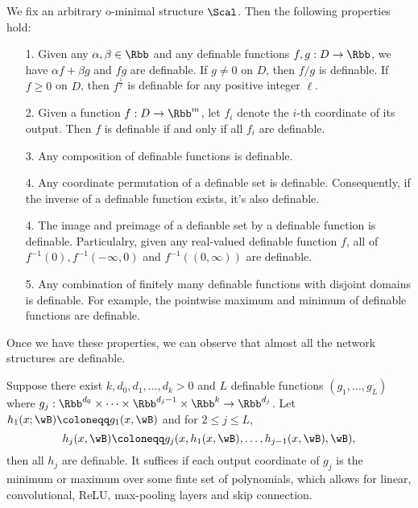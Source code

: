 \begin{proposition}
\label{prop:Property of definable functions} We fix an arbitrary o-minimal structure $\Scal$. Then the following properties hold:
\begin{itemize}
    \item [1.] Given any $\alpha , \beta \in \Rbb$ and any definable functions $f,g : D \to \Rbb$, we have $\alpha f + \beta g $ and $fg$ are definable. If $g \neq 0$ on $D$, then $f/g$ is definable. If $f \ge 0$ on $D$, then $f^{\frac{1}{\ell}}$ is definable for any positive integer $\ell$. 
    \item [2.] Given a function $f:D \to \Rbb^m$, let $f_i$ denote the $i$-th coordinate of its output. Then $f$ is definable if and only if all $f_i$ are definable. 
    \item [3.] Any composition of definable functions is definable. 
    \item [4.] Any coordinate permutation of a definable set is definable. Consequently, if the  inverse of a definable function exists, it's also definable. 
    \item [4.] The image and preimage of a defianble set by a definable function is definable. Particulalry, given any real-valued definable function $f$, all of $f^{-1}(0), f^{-1} ( -\infty, 0 )$ and $ f^{-1} ( (0,\infty) )  $ are definable. 
    \item [5.] Any combination of finitely many definable functions with disjoint domains is definable. For example, the pointwise maximum and minimum of definable functions are definable. 
\end{itemize}
\end{proposition}

Once we have these properties, we can observe that almost all the network structures are definable. 


\begin{lemma}
\label{lem:Definable network structures}
Suppose there exist $k, d_0, d_1, \ldots ,d_k >0$ and $L$ definable functions $ (g_1,\ldots ,g_L) $ where $g_j: \Rbb^{d_0} \times \cdots \times \Rbb^{d_j-1} \times \Rbb^{k} \to \Rbb^{d_j}$. Let $h_1(x;\wB) \coloneqq g_1 (x, \wB)$ and for $2\le j \le L$, 
\[
h_j(x, \wB) \coloneqq g_j( x, h_1(x,\wB) ,\ldots ,h_{j-1}(x,\wB), \wB),
\]
then all $h_j$ are definable. It suffices if each output coordinate of $g_j$ is the minimum or maximum over some finte set of polynomials, which allows for linear, convolutional, ReLU, max-pooling layers and skip connection.
\end{lemma}

